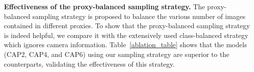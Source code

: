 \documentclass[letterpaper]{article} %
\begin{document}


\textbf{Effectiveness of the proxy-balanced sampling strategy.} The proxy-balanced sampling strategy is proposed to balance the various number of images contained in different proxies. To show that the proxy-balanced sampling strategy is indeed helpful, we compare it with the extensively used class-balanced strategy which ignores camera information. Table~\ref{ablation_table} shows that the models (CAP2, CAP4, and CAP6) using our sampling strategy are superior to the counterparts, validating the effectiveness of this strategy. 
\end{document}
